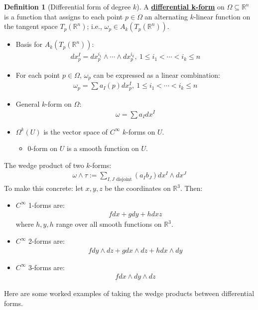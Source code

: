 \documentclass[11pt]{scrartcl}
\newcommand{\R}[0]{\mathbb{R}}
\theoremstyle{definition}
\newtheorem{definition}{Definition}
\theoremstyle{remark}
\newcommand{\dfn}[1]{\textbf{\underline{#1}}}
\begin{document}
{\begin{definition}[Differential form of degree $k$]
	A \dfn{differential k-form} on $\Omega \subseteq \R^n$ is a function that assigns to each point $p \in \Omega$ an alternating $k$-linear function on the tangent space $T_p(\R^n)$; i.e., $\omega_p \in A_k(T_p(\R^n))$. 
\end{definition}
\begin{itemize}[noitemsep]
	\item Basis for $A_k(T_p (\R^n))$: 
	\begin{align*}
		dx_p^I = dx_p^{i_1} \wedge \cdots \wedge dx_p^{i_k},\ 1 \leq i_1 < \cdots < i_k \leq n
	\end{align*}
	\item For each point $p \in \Omega$, $\omega_p$ can be expressed as a linear combination: 
	\begin{align*}
		\omega_p = \sum a_I(p) dx_p^I,\ 1 \leq i_1 < \cdots < i_k \leq n
	\end{align*}
	\item General $k$-form on $\Omega$: 
	\begin{align*}
		\omega = \sum a_I dx^I 
	\end{align*}
	\item $\Omega^k(U)$ is the vector space of $C^\infty$ $k$-forms on $U$. 
	\begin{itemize}[noitemsep]
		\item $0$-form on $U$ is a smooth function on $U$. 
	\end{itemize}
\end{itemize}
The wedge product of two $k$-forms: 
\begin{align*}
	\omega \wedge \tau := \sum_{I,J \text{ disjoint}} (a_I b_J) dx^I \wedge dx^J 
\end{align*}
To make this concrete: let $x,y,z$ be the coordinates on $\R^3$. Then:
\begin{itemize}[noitemsep]
	\item $C^\infty$ 1-forms are: 
	\begin{align*}
		fdx + gdy + hdxz 
	\end{align*}
	where $h,y,h$ range over all smooth functions on $\R^3$.
	\item $C^\infty$ 2-forms are: 
	\begin{align*}
		f dy \wedge dz + g dx \wedge dz + h dx \wedge dy 
	\end{align*}
	\item $C^\infty$ 3-forms are: 
	\begin{align*}
		f dx \wedge dy \wedge dz 
	\end{align*}
\end{itemize}
Here are some worked examples of taking the wedge products between differential forms. 

}
\end{document}
